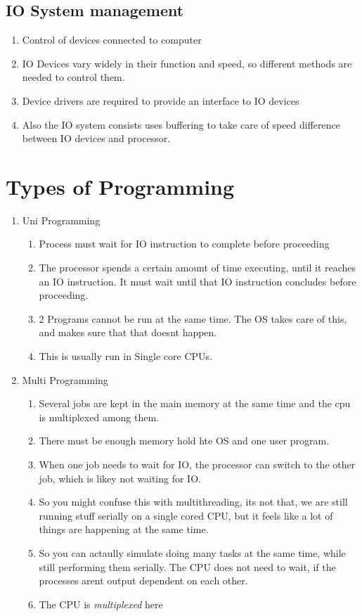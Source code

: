 \documentclass[11pt]{article}
\begin{document}
\subsection{IO System management}

\begin{enumerate}
	\item Control of devices connected to computer
	\item IO Devices vary widely in their function and speed, so different methods are needed to control them.
	\item Device drivers are required to provide an interface to IO devices
	\item Also the IO system consists uses buffering to take care of speed difference between IO devices and processor.
\end{enumerate}

\section{Types of Programming}

\begin{enumerate}
	\item Uni Programming
	      \begin{enumerate}
		      \item Process must wait for IO instruction to complete before proceeding
		      \item The processor spends a certain amount of time executing, until it reaches an IO instruction. It must wait until that IO instruction concludes before proceeding.
		      \item 2 Programs cannot be run at the same time. The OS takes care of this, and makes sure that that doesnt happen.
		      \item This is usually run in Single core CPUs.
	      \end{enumerate}

	\item Multi Programming
	      \begin{enumerate}
		      \item Several jobs are kept in the main memory at the same time and the cpu is multiplexed among them.
		      \item There must be enough memory hold hte OS and one user program.
		      \item When one job needs to wait for IO, the processor can switch to the other job, which is likey not waiting for IO.
		      \item So you might confuse this with multithreading, its not that, we are still running stuff serially on a single cored CPU, but it feels like a lot of things are happening at the same time.
		      \item So you can actaully simulate doing many tasks at the same time, while still performing them serially. The CPU does not need to wait, if the processes arent output dependent on each other.
		      \item The CPU is \textit{multiplexed} here
	      \end{enumerate}

\end{enumerate}
\end{document}
